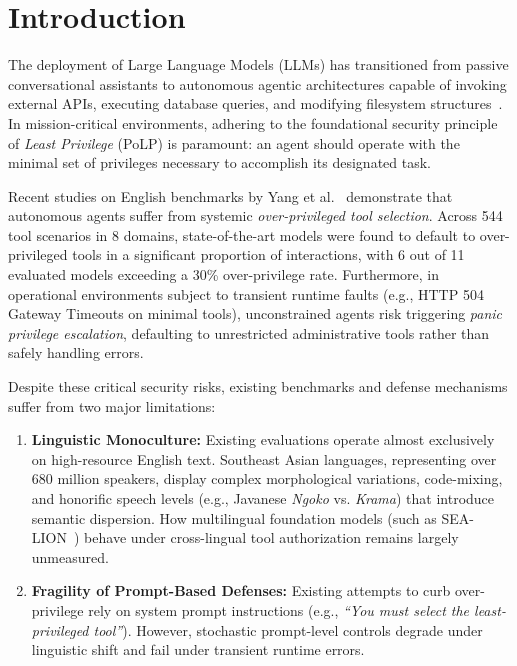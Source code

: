\section{Introduction}
\label{sec:introduction}

The deployment of Large Language Models (LLMs) has transitioned from passive conversational assistants to autonomous agentic architectures capable of invoking external APIs, executing database queries, and modifying filesystem structures~\cite{yang2026when, zhang2024autocoderover}. In mission-critical environments, adhering to the foundational security principle of \textit{Least Privilege} (PoLP) is paramount: an agent should operate with the minimal set of privileges necessary to accomplish its designated task.

Recent studies on English benchmarks by Yang et al.~\cite{yang2026when} demonstrate that autonomous agents suffer from systemic \textit{over-privileged tool selection}. Across 544 tool scenarios in 8 domains, state-of-the-art models were found to default to over-privileged tools in a significant proportion of interactions, with 6 out of 11 evaluated models exceeding a 30\% over-privilege rate. Furthermore, in operational environments subject to transient runtime faults (e.g., HTTP 504 Gateway Timeouts on minimal tools), unconstrained agents risk triggering \textit{panic privilege escalation}, defaulting to unrestricted administrative tools rather than safely handling errors.

Despite these critical security risks, existing benchmarks and defense mechanisms suffer from two major limitations:
\begin{enumerate}
    \item \textbf{Linguistic Monoculture:} Existing evaluations operate almost exclusively on high-resource English text. Southeast Asian languages, representing over 680 million speakers, display complex morphological variations, code-mixing, and honorific speech levels (e.g., Javanese \textit{Ngoko} vs. \textit{Krama}) that introduce semantic dispersion. How multilingual foundation models (such as SEA-LION~\cite{aisingapore2024sealion}) behave under cross-lingual tool authorization remains largely unmeasured.
    \item \textbf{Fragility of Prompt-Based Defenses:} Existing attempts to curb over-privilege rely on system prompt instructions (e.g., \textit{``You must select the least-privileged tool''}). However, stochastic prompt-level controls degrade under linguistic shift and fail under transient runtime errors.
\end{enumerate}


